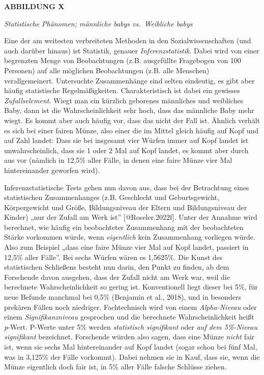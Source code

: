 \documentclass[
  letterpaper,
  DIV=11,
  numbers=noendperiod]{scrreprt}
\begin{document}
\textbf{ABBILDUNG X}

\emph{Statistische Phänomen; männliche babys vs.~Weibliche babys}

\begin{tcolorbox}[enhanced jigsaw, bottomrule=.15mm, toprule=.15mm, opacitybacktitle=0.6, breakable, colback=white, coltitle=black, bottomtitle=1mm, toptitle=1mm, titlerule=0mm, title=\textcolor{quarto-callout-note-color}{\faInfo}\hspace{0.5em}{Statistische Signifikanz}, rightrule=.15mm, arc=.35mm, opacityback=0, leftrule=.75mm, left=2mm, colbacktitle=quarto-callout-note-color!10!white, colframe=quarto-callout-note-color-frame]

Eine der am weitesten verbreiteten Methoden in den Sozialwissenschaften
(und auch darüber hinaus) ist Statistik, genauer
\emph{Inferenzstatistik}. Dabei wird von einer begrenzten Menge von
Beobachtungen (z.B. ausgefüllte Fragebogen von 100 Personen) auf alle
möglichen Beobachtungen (z.B. alle Menschen) verallgemeinert.
Untersuchte Zusammenhänge sind selten eindeutig, es gibt aber häufig
statistische Regelmäßigkeiten. Charakteristisch ist dabei ein gewisses
\emph{Zufallselement}. Wiegt man ein kürzlich geborenes männliches und
weibliches Baby, dann ist die Wahrscheinlichkeit sehr hoch, dass das
männliche Baby mehr wiegt. Es kommt aber auch häufig vor, dass das nicht
der Fall ist. Ähnlich verhält es sich bei einer fairen Münze, also einer
die im Mittel gleich häufig auf Kopf und auf Zahl landet: Dass sie bei
insgesamt vier Würfen immer auf Kopf landet ist unwahrscheinlich, dass
sie 1 oder 2 Mal auf Kopf landet, es kommt aber durch aus vor (nämlich
in 12,5\% aller Fälle, in denen eine faire Münze vier Mal hintereinander
geworfen wird).

Inferenzstatistische Tests gehen nun davon aus, dass bei der Betrachtung
eines statistischen Zusammenhanges (z.B. Geschlecht und Geburtsgewicht,
Körpergewicht und Größe, Bildungsniveau der Eltern und Bildungsniveau
der Kinder) „nur der Zufall am Werk ist'' {[}@Roseler.2022f{]}. Unter
der Annahme wird berechnet, wie häufig ein beobachteter Zusammenhang mit
der beobachteten Stärke vorkommen würde, wenn \emph{eigentlich} kein
Zusammenhang vorliegen würde. Also zum Beispiel „dass eine faire Münze
vier Mal auf Kopf landet, passiert in 12,5\% aller Fälle''. Bei sechs
Würfen wären es 1,5625\%. Die Kunst des statistischen Schließens besteht
nun darin, den Punkt zu finden, ab dem Forschende davon ausgehen, dass
der Zufall nicht am Werk war, weil die berechnete Wahrscheinlichkeit so
gering ist. Konventionell liegt dieser bei 5\%, für neue Befunde
manchmal bei 0,5\% (Benjamin et al., 2018), und in besonders prekären
Fällen noch niedriger. Fachtechnisch wird von einem \emph{Alpha-Niveau}
oder einem \emph{Signifikanzniveau} gesprochen und die berechnete
Wahrscheinlichkeit heißt \emph{p}-Wert. P-Werte unter 5\% werden
\emph{statistisch signifikant} oder \emph{auf dem 5\%-Niveau
signifikant} bezeichnet. Forschende würden also sagen, dass eine Münze
\emph{nicht} fair ist, wenn sie sechs Mal hintereinander auf Kopf landet
(sogar schon bei fünf Mal, was in 3,125\% der Fälle vorkommt). Dabei
nehmen sie in Kauf, dass sie, wenn die Münze eigentlich doch fair ist,
in 5\% aller Fälle falsche Schlüsse ziehen.


\end{tcolorbox}
\end{document}
